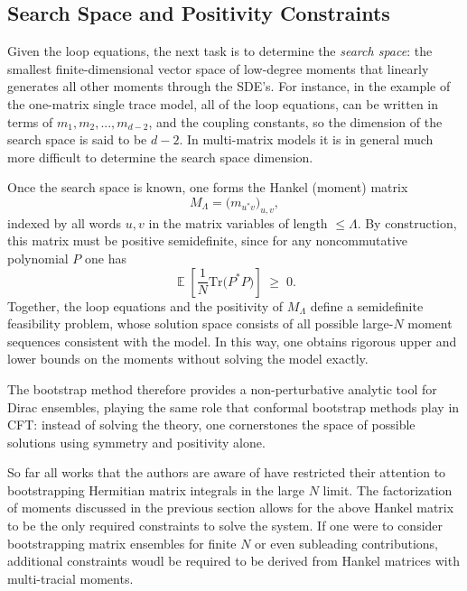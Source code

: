 \documentclass[11pt]{article}
\theoremstyle{plain}
\DeclareMathOperator{\ex}{\mathbb{E}}
\begin{document}
\subsection{Search Space and Positivity Constraints}

Given the loop equations, the next task is to determine the \emph{search space}: the smallest finite-dimensional
vector space of low-degree moments that linearly generates all other moments through the SDE's. For instance, in the example of the one-matrix single trace model, all of the loop equations, can be written in terms of $m_{1},m_{2},...,m_{d-2}$, and the coupling constants, so the dimension of the search space is said to be $d-2$. In multi-matrix models it is in general much more difficult to determine the search space dimension.


Once the search space is known, one forms the Hankel (moment) matrix
\[
M_{\Lambda} = \bigl( m_{u^\ast v} \bigr)_{u,v},
\]
indexed by all words $u,v$ in the matrix variables of length $\leq \Lambda$. By construction, this matrix
must be positive semidefinite, since for any noncommutative polynomial $P$ one has
\[
\ex \left[\frac{1}{N}\mathrm{Tr}\bigl( P^\ast P \bigr) \right] \;\geq\; 0.
\]
Together, the loop equations and the positivity of $M_\Lambda$ define a semidefinite feasibility problem,
whose solution space consists of all possible large-$N$ moment sequences consistent with the model.
In this way, one obtains rigorous upper and lower bounds on the moments without solving the model exactly.

The bootstrap method therefore provides a non-perturbative analytic tool for Dirac ensembles, playing the
same role that conformal bootstrap methods play in CFT: instead of solving the theory, one cornerstones
the space of possible solutions using symmetry and positivity alone.

So far all works that the authors are aware of have restricted their attention to bootstrapping Hermitian matrix integrals in the large $N$ limit. The factorization of moments discussed in the previous section allows for the above Hankel matrix to be the only required constraints to solve the system. If one were to consider bootstrapping matrix ensembles for finite $N$ or even subleading contributions, additional constraints woudl be required to be derived from Hankel matrices with multi-tracial moments.
\end{document}
